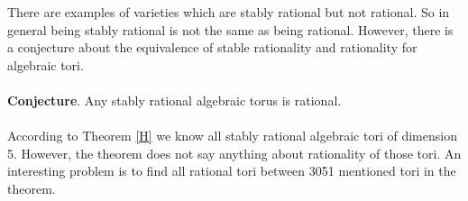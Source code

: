\documentclass[a4paper, 14pt]{extarticle}
\theoremstyle{plain}
\theoremstyle{definition}
\begin{document}
 \noindent
There are examples of varieties which are stably rational but not rational. So in general 
being stably rational is not the same as being rational. However, there is a conjecture 
about the equivalence of stable rationality and rationality for algebraic tori.\\ \\
 \textbf{Conjecture}. \cite[Section 2.6.1]{Voskresenskii} Any stably rational algebraic 
 torus is rational.\\
 \\
% 
According to Theorem \ref{H} we know all stably rational algebraic tori of dimension 5. 
However, the theorem does not say anything about rationality of those tori. An interesting 
problem is to find all rational tori between 3051 mentioned tori in the theorem.
 
\end{document}
